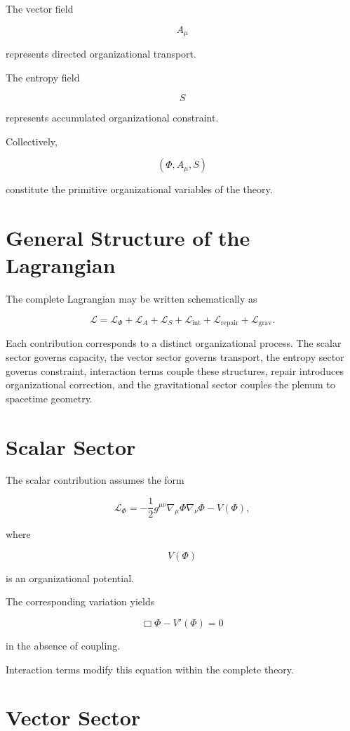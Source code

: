 \documentclass[11pt,oneside]{book}
\numberwithin{equation}{chapter}
\theoremstyle{definition}
\theoremstyle{plain}
\begin{document}
The vector field

\[
A_\mu
\]

represents directed organizational transport.

The entropy field

\[
S
\]

represents accumulated organizational constraint.

Collectively,

\[
(\Phi,A_\mu,S)
\]

constitute the primitive organizational variables of the theory.

\section{General Structure of the Lagrangian}

The complete Lagrangian may be written schematically as

\[
\mathcal L
=
\mathcal L_\Phi
+
\mathcal L_A
+
\mathcal L_S
+
\mathcal L_{\mathrm{int}}
+
\mathcal L_{\mathrm{repair}}
+
\mathcal L_{\mathrm{grav}}.
\]

Each contribution corresponds to a distinct organizational process. The scalar sector governs capacity, the vector sector governs transport, the entropy sector governs constraint, interaction terms couple these structures, repair introduces organizational correction, and the gravitational sector couples the plenum to spacetime geometry.

\section{Scalar Sector}

The scalar contribution assumes the form

\[
\mathcal L_\Phi
=
-\frac12
g^{\mu\nu}
\nabla_\mu\Phi
\nabla_\nu\Phi
-
V(\Phi),
\]

where

\[
V(\Phi)
\]

is an organizational potential.

The corresponding variation yields

\[
\Box\Phi
-
V'(\Phi)
=
0
\]

in the absence of coupling.

Interaction terms modify this equation within the complete theory.

\section{Vector Sector}
\end{document}
